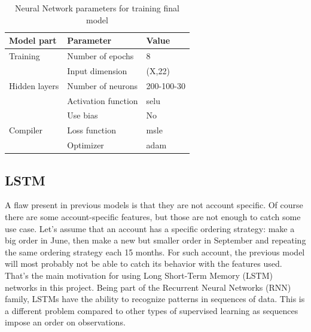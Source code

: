 \begin{table}[]
    \centering
    \begin{tabular}{l|l|l}
        \textbf{Model part}           & \textbf{Parameter}                 & \textbf{Value}         \\ \hline
        Training                      & Number of epochs                   & 8                     \\
                                      & Input dimension                    & (X,22)                     \\ \hline
        Hidden layers                 & Number of neurons                  & 200-100-30                     \\
                                      & Activation function                & selu                     \\
                                      & Use bias                           & No                     \\ \hline
        \multicolumn{1}{l|}{Compiler} & \multicolumn{1}{l|}{Loss function} & \multicolumn{1}{l}{msle} \\
        \multicolumn{1}{l|}{}         & \multicolumn{1}{l|}{Optimizer}     & \multicolumn{1}{l}{adam}
    \end{tabular}
    \caption{Neural Network parameters for training final model}
    \label{tab:nn-final-parameters}
\end{table}


\subsection{LSTM}
A flaw present in previous models is that they are not account specific. Of course there are some account-specific features, but those are not enough to catch some use case. Let's assume that an account has a specific ordering strategy: make a big order in June, then make a new but smaller order in September and repeating the same ordering strategy each 15 months. For such account, the previous model will most probably not be able to catch its behavior with the features used. That's the main motivation for using Long Short-Term Memory (LSTM) networks in this project. Being part of the Recurrent Neural Networks (RNN) family, LSTMs have the ability to recognize patterns in sequences of data. This is a different problem compared to other types of supervised learning as sequences impose an order on observations.

